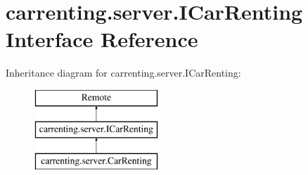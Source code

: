 \hypertarget{interfacecarrenting_1_1server_1_1_i_car_renting}{}\section{carrenting.\+server.\+I\+Car\+Renting Interface Reference}
\label{interfacecarrenting_1_1server_1_1_i_car_renting}
Inheritance diagram for carrenting.\+server.\+I\+Car\+Renting\+:\begin{figure}[H]
\begin{center}
\leavevmode
\includegraphics[height=3.000000cm]{interfacecarrenting_1_1server_1_1_i_car_renting}
\end{center}
\end{figure}
